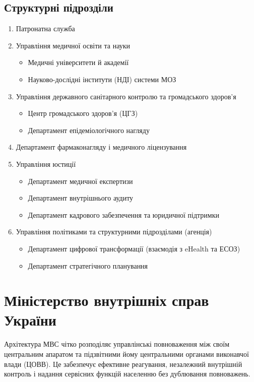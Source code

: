 \subsection*{Структурні підрозділи}

\begin{enumerate}
    \item Патронатна служба
    \item Управління медичної освіти та науки
    \begin{itemize}
        \item Медичні університети й академії
        \item Науково-дослідні інститути (НДІ) системи МОЗ
    \end{itemize}
    \item Управління державного санітарного контролю та громадського здоров'я
    \begin{itemize}
        \item Центр громадського здоров'я (ЦГЗ)
        \item Департамент епідеміологічного нагляду
    \end{itemize}
    \item Департамент фармаконагляду і медичного ліцензування
    \item Управління юстиції
    \begin{itemize}
        \item Департамент медичної експертизи
        \item Департамент внутрішнього аудиту
        \item Департамент кадрового забезпечення та юридичної підтримки
    \end{itemize}
    \item Управління політиками та структурними підрозділами (агенція)
    \begin{itemize}
        \item Департамент цифрової трансформації (взаємодія з eHealth та ЕСОЗ)
        \item Департамент стратегічного планування
    \end{itemize}
\end{enumerate}

\newpage
\section{Міністерство внутрішніх справ України}

Архітектура МВС чітко розподіляє управлінські повноваження між своїм центральним апаратом та підзвітними йому центральними органами виконавчої влади (ЦОВВ). Це забезпечує ефективне реагування, незалежний внутрішній контроль і надання сервісних функцій населенню без дублювання повноважень.

